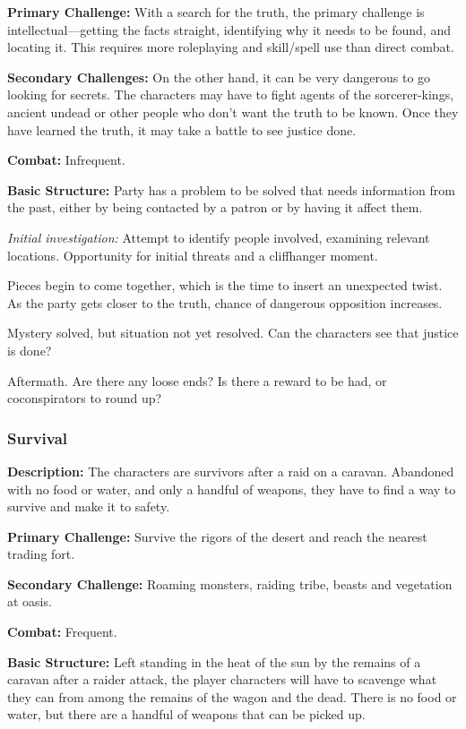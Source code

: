 \textbf{Primary Challenge:} With a search for the truth, the primary challenge is intellectual---getting the facts straight, identifying why it needs to be found, and locating it. This requires more roleplaying and skill/spell use than direct combat.

\textbf{Secondary Challenges:} On the other hand, it can be very dangerous to go looking for secrets. The characters may have to fight agents of the sorcerer-kings, ancient undead or other people who don't want the truth to be known. Once they have learned the truth, it may take a battle to see justice done.

\textbf{Combat:} Infrequent.

\textbf{Basic Structure:} Party has a problem to be solved that needs information from the past, either by being contacted by a patron or by having it affect them.

\textit{Initial investigation:} Attempt to identify people involved, examining relevant locations. Opportunity for initial threats and a cliffhanger moment.

Pieces begin to come together, which is the time to insert an unexpected twist. As the party gets closer to the truth, chance of dangerous opposition increases.

Mystery solved, but situation not yet resolved. Can the characters see that justice is done? 

Aftermath. Are there any loose ends? Is there a reward to be had, or coconspirators to round up?


\subsubsection{Survival}

\textbf{Description:} The characters are survivors after a raid on a caravan. Abandoned with no food or water, and only a handful of weapons, they have to find a way to survive and make it to safety.

\textbf{Primary Challenge:} Survive the rigors of the desert and reach the nearest trading fort.

\textbf{Secondary Challenge:} Roaming monsters, raiding tribe, beasts and vegetation at oasis.

\textbf{Combat:} Frequent.

\textbf{Basic Structure:} Left standing in the heat of the sun by the remains of a caravan after a raider attack, the player characters will have to scavenge what they can from among the remains of the wagon and the dead. There is no food or water, but there are a handful of weapons that can be picked up.

